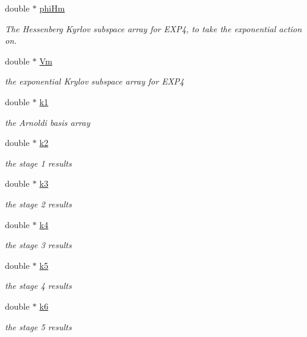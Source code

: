 \begin{DoxyCompactItemize}
double $\ast$ \hyperlink{structexp4cu_1_1solver__memory_a3278cfbb9029ad325ca304b995097c64}{phi\+Hm}
\begin{DoxyCompactList}\small\item\em The Hessenberg Kyrlov subspace array for E\+X\+P4, to take the exponential action on. \end{DoxyCompactList}\item 
double $\ast$ \hyperlink{structexp4cu_1_1solver__memory_a089d1909b39f39551063214762c66e08}{Vm}
\begin{DoxyCompactList}\small\item\em the exponential Krylov subspace array for E\+X\+P4 \end{DoxyCompactList}\item 
double $\ast$ \hyperlink{structexp4cu_1_1solver__memory_a184c23b8411b8772b53dae0e6fe99723}{k1}
\begin{DoxyCompactList}\small\item\em the Arnoldi basis array \end{DoxyCompactList}\item 
double $\ast$ \hyperlink{structexp4cu_1_1solver__memory_a8f4b3ca501187945e4620f44506f6882}{k2}
\begin{DoxyCompactList}\small\item\em the stage 1 results \end{DoxyCompactList}\item 
double $\ast$ \hyperlink{structexp4cu_1_1solver__memory_ad874f97ba264e3cefb19482eef2a729d}{k3}
\begin{DoxyCompactList}\small\item\em the stage 2 results \end{DoxyCompactList}\item 
double $\ast$ \hyperlink{structexp4cu_1_1solver__memory_a060f44ce2caacb3fc536671b591e11a2}{k4}
\begin{DoxyCompactList}\small\item\em the stage 3 results \end{DoxyCompactList}\item 
double $\ast$ \hyperlink{structexp4cu_1_1solver__memory_a749746fa09b01076ee56c0402d003fb7}{k5}
\begin{DoxyCompactList}\small\item\em the stage 4 results \end{DoxyCompactList}\item 
double $\ast$ \hyperlink{structexp4cu_1_1solver__memory_a8ccbe7fd464f064245b77c2df44956ef}{k6}
\begin{DoxyCompactList}\small\item\em the stage 5 results \end{DoxyCompactList}\item 

\end{DoxyCompactItemize}
